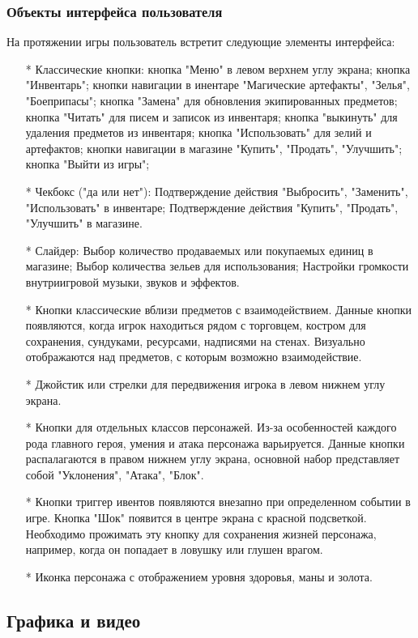\documentclass{article}
\begin{document}
\subsubsection{Объекты интерфейса пользователя}
На протяжении игры пользователь встретит следующие элементы интерфейса:
\begin{itemize}
\item[*] Классические кнопки: кнопка "Меню" в левом верхнем углу экрана; кнопка "Инвентарь"; кнопки навигации в инентаре "Магические артефакты", "Зелья", "Боеприпасы"; кнопка "Замена" для обновления экипированных предметов; кнопка "Читать" для писем и записок из инвентаря; кнопка "выкинуть" для удаления предметов из инвентаря; кнопка "Использовать" для зелий и артефактов; кнопки навигации в магазине "Купить", "Продать", "Улучшить"; кнопка "Выйти из игры";
\item[*] Чекбокс ("да или нет"): Подтверждение действия "Выбросить", "Заменить", "Использовать" в инвентаре; Подтверждение действия "Купить", "Продать", "Улучшить" в магазине.
\item[*] Слайдер: Выбор количество продаваемых или покупаемых единиц в магазине; Выбор количества зельев для использования; Настройки громкости внутриигровой музыки, звуков и эффектов. 
\item[*] Кнопки классические вблизи предметов с взаимодействием. Данные кнопки появляются, когда игрок находиться рядом с торговцем, костром для сохранения, сундуками, ресурсами, надписями на стенах. Визуально отображаются над предметов, с которым возможно взаимодействие.
\item[*] Джойстик или стрелки для передвижения игрока в левом нижнем углу экрана.
\item[*] Кнопки для отдельных классов персонажей. Из-за особенностей каждого рода главного героя, умения и атака персонажа варьируется. Данные кнопки распалагаются в правом нижнем углу экрана, основной набор представляет собой "Уклонения", "Атака", "Блок".
\item[*] Кнопки триггер ивентов появляются внезапно при определенном событии в игре. Кнопка "Шок" появится в центре экрана с красной подсветкой. Необходимо прожимать эту кнопку для сохранения жизней персонажа,  например, когда он попадает в ловушку или глушен врагом.
\item[*] Иконка персонажа с отображением уровня здоровья, маны и золота. 
\end{itemize}

\subsection{Графика и видео}
\end{document}
